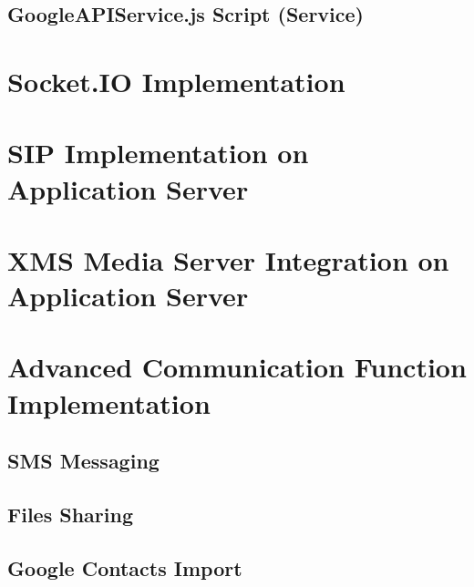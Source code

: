 \subsection{GoogleAPIService.js Script (Service)}

\par 

\section{Socket.IO Implementation}

\section{SIP Implementation on Application Server}

\section{XMS Media Server Integration on Application Server}

\section{Advanced Communication Function Implementation}

\subsection{SMS Messaging}

\subsection{Files Sharing}

\subsection{Google Contacts Import}